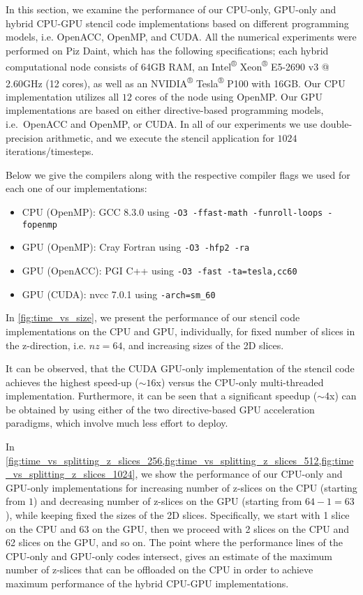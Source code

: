 % 




In this section, we examine the performance of our CPU-only, GPU-only and hybrid CPU-GPU stencil code implementations based on different programming models, i.e. OpenACC, OpenMP, and CUDA.
All the numerical experiments were performed on Piz Daint, which has the following specifications;
each hybrid computational node consists of 64GB RAM, an Intel\textsuperscript{®} Xeon\textsuperscript{®} E5-2690 v3 @ 2.60GHz (12 cores), as well as an NVIDIA\textsuperscript{®} Tesla\textsuperscript{®} P100 with 16GB.
Our CPU implementation utilizes all $12$ cores of the node using OpenMP.
Our GPU implementations are based on either directive-based programming models, i.e.\ OpenACC and OpenMP, or CUDA.
In all of our experiments we use double-precision arithmetic, and we execute the stencil application for $1024$ iterations/timesteps.

Below we give the compilers along with the respective compiler flags we used for each one of our implementations:
\begin{itemize}
\item CPU (OpenMP): GCC 8.3.0 using \texttt{-O3 -ffast-math -funroll-loops -fopenmp}
\item GPU (OpenMP): Cray Fortran using \texttt{-O3 -hfp2 -ra}
\item GPU (OpenACC): PGI C++ using  \texttt{-O3 -fast -ta=tesla,cc60}
\item GPU (CUDA):  nvcc 7.0.1 using \texttt{-arch=sm\_60}
\end{itemize}

In \cref{fig:time_vs_size}, we present the performance of our stencil code implementations on the CPU and GPU, individually, for fixed number of slices in the z-direction, i.e. $nz = 64$, and increasing sizes of the 2D slices. 


It can be observed, that the CUDA GPU-only implementation of the stencil code achieves the highest speed-up ($\sim16$x) versus the CPU-only multi-threaded implementation.
Furthermore, it can be seen that a significant speedup ($\sim$4x) can be obtained by using either of the two directive-based GPU acceleration paradigms, which involve much less effort to deploy. 

In \cref{fig:time_vs_splitting_z_slices_256,fig:time_vs_splitting_z_slices_512,fig:time_vs_splitting_z_slices_1024}, we show the performance of our CPU-only and GPU-only implementations for increasing number of z-slices on the CPU (starting from $1$) and decreasing number of z-slices on the GPU (starting from $64-1=63$), while keeping fixed the sizes of the 2D slices.
Specifically, we start with 1 slice on the CPU and 63 on the GPU, then we proceed with 2 slices on the CPU and 62 slices on the GPU, and so on.
The point where the performance lines of the CPU-only and GPU-only codes intersect, gives an estimate of the maximum number of z-slices that can be offloaded on the CPU in order to achieve maximum performance of the hybrid CPU-GPU implementations.



